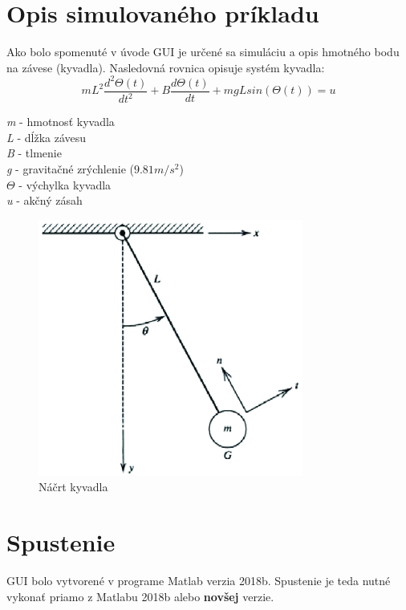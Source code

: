 \section{Opis simulovaného príkladu}
Ako bolo spomenuté v úvode GUI je určené sa simuláciu a opis hmotného bodu na závese (kyvadla). Nasledovná rovnica opisuje systém kyvadla:
\begin{equation}
mL^2\frac{d^2\Theta (t)}{dt^2} + B\frac{d\Theta (t)}{dt} + mgL sin(\Theta (t)) = u
\label{eqn:kyveq}
\end{equation}
\begin{center}
	\textit{m} - hmotnosť kyvadla\\
	\textit{L} - dĺžka závesu\\
	\textit{B} - tlmenie\\
	\textit{g} - gravitačné zrýchlenie ($9.81 m/s^2$)\\
	$\Theta$ - výchylka kyvadla\\
	\textit{u} - akčný zásah
	
		\begin{figure}[h!]
		\centering
		\includegraphics[width=0.8\linewidth]{pend}
		\caption{Náčrt kyvadla}
		\label{fig:pendulum}
	\end{figure}
	
\end{center}
 
\newpage
\section{Spustenie}
GUI bolo vytvorené v programe Matlab verzia 2018b. Spustenie je teda nutné vykonať priamo z Matlabu 2018b alebo \textbf{novšej} verzie. 
